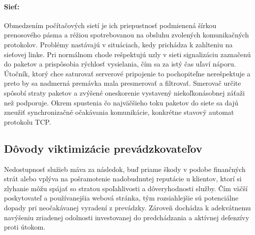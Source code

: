 \documentclass[12pt, a4paper]{article}
\begin{document}
\paragraph{Sieť:}
Obmedzením počítačových sietí je ich priepustnosť podmienená šírkou prenosového pásma a réžiou 
spotrebovanou na obsluhu zvolených komunikačných protokolov. Problémy nastávajú v situáciach, kedy prichádza
k zahlteniu na sieťovej linke. Pri normálnom chode rešpektujú uzly v sieti signalizáciu zaznačenú do 
paketov a prispôsobia rýchlosť vysielania, čím sa za istý čas uľaví náporu. Útočník, ktorý chce saturovať 
serverové pripojenie to  pochopiteľne nerešpektuje a preto by sa nadmerná premávka mala presmerovať a 
filtrovať. Smerovač určite spôsobí straty paketov a zvýšené oneskorenie vystavený niekoľkonásobnej záťaži 
než podporuje. Okrem spustenia čo najväčšieho toku paketov do siete sa dajú zneužiť synchronizačné 
očakávania komunikácie, konkrétne stavový automat protokolu TCP.

\subsection{Dôvody viktimizácie prevádzkovateľov}
Nedostupnosť služieb máva za následok, buď priame škody v podobe finančných strát alebo vplýva na 
pošramotenie nadobudnutej reputácie u klientov, ktorí si zlyhanie môžu spájať so stratou spoľahlivosti a 
dôveryhodnosti služby. Čím väčší poskytovateľ a používanejšia webová stránka, tým rozsiahlejšie sú 
potenciálne dopady pri neočakávanej vyradení z prevádzky. Zároveň dochádza k adekvátnemu navýšeniu 
zriadenej odolnosti investovanej do predchádzania a aktívnej defenzívy proti útokom.  
\end{document}
